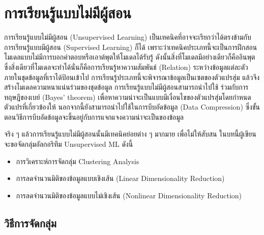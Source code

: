 

\chapter{การเรียนรู้แบบไม่มีผู้สอน}
\label{ch:unsup_ml}

การเรียนรู้แบบไม่มีผู้สอน (Unsupervised Learning) เป็นเทคนิคที่อาจจะเรียกว่าได้ตรงข้ามกับการเรียนรู้แบบมีผู้สอน (Supervised Learning) 
ก็ได้ เพราะว่าเทคนิคประเภทนี้จะเป็นการฝึกสอนโมเดลแบบไม่มีการบอกคำตอบหรือเอาต์พุตให้โมเดลได้รับรู้ ดังนั้นสิ่งที่โมเดลมีอย่างเดียวก็คืออินพุต
ซึ่งสิ่งเดียวที่โมเดลจะทำได้นั่นก็คือการเรียนรู้หาความสัมพันธ์ (Relation) ระหว่างข้อมูลแต่ละตัวภายในชุดข้อมูลที่เราได้ป้อนเข้าไป 
การเรียนรู้ประเภทนี้จะพิจารณาข้อมูลเป็นเซตของตัวแปรสุ่ม แล้วจึงสร้างโมเดลความหนาแน่นร่วมของชุดข้อมูล การเรียนรู้แบบไม่มีผู้สอนสามารถนำไปใช้%
ร่วมกับการทฤษฎีของเบย์ (Bayes' theorem) เพื่อหาความน่าจะเป็นแบบมีเงื่อนไขของตัวแปรสุ่มโดยกำหนดตัวแปรที่เกี่ยวข้องให้ 
นอกจากนี้ยังสามารถนำไปใช้ในการบีบอัดข้อมูล (Data Compression) ซึ่งขั้นตอนวิธีการบีบอัดข้อมูลจะขึ้นอยู่กับการแจกแจงความน่าจะเป็นของข้อมูล

จริง ๆ แล้วการเรียนรู้แบบไม่มีผู้สอนนั้นมีเทคนิคย่อยต่าง ๆ มากมาย เพื่อไม่ให้สับสน ในบทนี้ผู้เขียนจะขอจัดกลุ่มอัลกอริทึม Unsupervised ML ดังนี้

\begin{itemize}
    \item การวิเคราะห์การจัดกลุ่ม Clustering Analysis
    
    \item การลดจำนวนมิติของข้อมูลแบบเชิงเส้น (Linear Dimensionality Reduction)
    
    \item การลดจำนวนมิติของข้อมูลแบบไม่เชิงเส้น (Nonlinear Dimensionality Reduction)
\end{itemize}

\section{วิธีการจัดกลุ่ม}
\label{sec:clustering}

